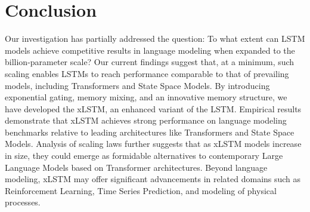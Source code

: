 \section{Conclusion}
Our investigation has partially addressed the question: To what extent can LSTM models achieve competitive results in language modeling when expanded to the billion-parameter scale? Our current findings suggest that, at a minimum, such scaling enables LSTMs to reach performance comparable to that of prevailing models, including Transformers and State Space Models. By introducing exponential gating, memory mixing, and an innovative memory structure, we have developed the xLSTM, an enhanced variant of the LSTM. Empirical results demonstrate that xLSTM achieves strong performance on language modeling benchmarks relative to leading architectures like Transformers and State Space Models. Analysis of scaling laws further suggests that as xLSTM models increase in size, they could emerge as formidable alternatives to contemporary Large Language Models based on Transformer architectures. Beyond language modeling, xLSTM may offer significant advancements in related domains such as Reinforcement Learning, Time Series Prediction, and modeling of physical processes.

